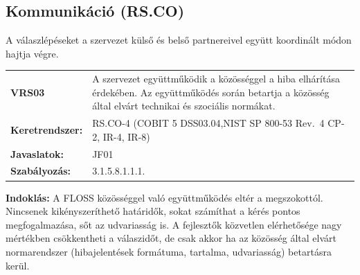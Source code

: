 \documentclass[12pt,magyar,a4paper,oneside]{scrreprt}
\begin{document}
\hypertarget{kommunikuxe1ciuxf3-rs.co}{%
\subsection{Kommunikáció (RS.CO)}\label{kommunikuxe1ciuxf3-rs.co}}

A válaszlépéseket a szervezet külső és belső partnereivel együtt
koordinált módon hajtja végre.

\begin{longtable}[]{@{}ll@{}}
\toprule
\endhead
\begin{minipage}[t]{0.16\columnwidth}\raggedright
\textbf{VRS03}\strut
\end{minipage} & \begin{minipage}[t]{0.79\columnwidth}\raggedright
A szervezet együttműködik a közösséggel a hiba elhárítása érdekében. Az
együttműködés során betartja a közösség által elvárt technikai és
szociális normákat.\strut
\end{minipage}\tabularnewline
\begin{minipage}[t]{0.16\columnwidth}\raggedright
\textbf{Keretrendszer:}\strut
\end{minipage} & \begin{minipage}[t]{0.79\columnwidth}\raggedright
RS.CO-4 (COBIT 5 DSS03.04,NIST SP 800-53 Rev.~4 CP-2, IR-4, IR-8)\strut
\end{minipage}\tabularnewline
\begin{minipage}[t]{0.16\columnwidth}\raggedright
\textbf{Javaslatok:}\strut
\end{minipage} & \begin{minipage}[t]{0.79\columnwidth}\raggedright
JF01\strut
\end{minipage}\tabularnewline
\begin{minipage}[t]{0.16\columnwidth}\raggedright
\textbf{Szabályozás:}\strut
\end{minipage} & \begin{minipage}[t]{0.79\columnwidth}\raggedright
3.1.5.8.1.1.1.\strut
\end{minipage}\tabularnewline
\bottomrule
\end{longtable}

\textbf{Indoklás: } A FLOSS közösséggel való együttműködés eltér a
megszokottól. Nincsenek kikényszeríthető határidők, sokat számíthat a
kérés pontos megfogalmazása, sőt az udvariasság is. A fejlesztők
közvetlen elérhetősége nagy mértékben csökkentheti a válaszidőt, de csak
akkor ha az közösség által elvárt normarendszer (hibajelentések
formátuma, tartalma, udvariasság) betartásra kerül.
\end{document}

